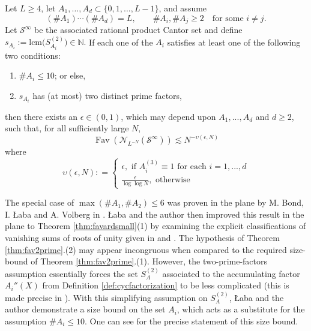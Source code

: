\documentclass[12pt]{amsart}
\numberwithin{equation}{section}
\DeclareMathOperator{\Fav}{Fav}
\begin{document}
\begin{theorem}\label{thm:fav2prime}\label{thm:favardsmall}
    Let $L\geq4$, let $A_1,\ldots,A_d\subset\{0,1,\ldots,L-1\}$, and assume
    \[
    (\#A_1)\cdots(\#A_d)=L,
    \qquad
    \#A_i,\#A_j\geq2\quad\text{for some }i\neq j.
    \]
    Let $\mathcal S^\infty$ be the associated rational product Cantor set and define
    $
    s_{A_i} := \textrm{lcm} \big(S_{A_i}^{(2)}\big) \in \mathbb{N}.
    $
    If each one of the $A_i$ satisfies at least one of the following two conditions:
    \begin{enumerate}
    \item $\# A_i \leq 10$; or else,
    \smallskip
    \item $s_{A_i}$ has (at most) two distinct prime factors,
    \end{enumerate}
    then there exists an $\epsilon \in (0,1)$, which may depend upon $A_1,...,A_d$ and $d \geq 2$, such that, for all sufficiently large $N$,
    \begin{equation}\label{eq:fav2prime}
    \Fav (\mathcal{N}_{L^{-N}} (\mathcal{S}^{\infty})) \lesssim N^{-\upsilon(\epsilon,N)}
    \end{equation}
    where
    $$
    \upsilon (\epsilon,N) : =
\begin{cases}
    \epsilon, \textrm{ if } A_i^{(3)} \equiv 1 \textrm{ for each } i = 1,...,d \\[1ex]
    \frac{\epsilon}{\log \log N}, \textrm{ otherwise }
\end{cases}
    $$
\end{theorem}

The special case of $\max (\#A_1, \# A_2) \leq 6$ was proven in the plane by M. Bond, I. {\L}aba and A. Volberg in \cite{BLV}. {\L}aba and the author then improved this result in the plane to Theorem \ref{thm:favardsmall}(1) by examining the explicit classifications of vanishing sums of roots of unity given in \cite{CDK} and \cite{PR}. The hypothesis of Theorem \ref{thm:fav2prime}.(2) may appear incongruous when compared to the required size-bound of Theorem \ref{thm:fav2prime}.(1). However, the two-prime-factors assumption essentially forces the set $S_A^{(2)}$ associated to the accumulating factor $A_i'' (X)$ from Definition \ref{def:cycfactorization} to be less complicated (this is made precise in \cite[Section 5]{LM}). With this simplifying assumption on $S_A^{(2)}$, {\L}aba and the author demonstrate a size bound on the set $A_i$, which acts as a substitute for the assumption $\# A_i \leq 10$. One can see \cite[Theorem 1.2]{LM} for the precise statement of this size bound.
\end{document}
